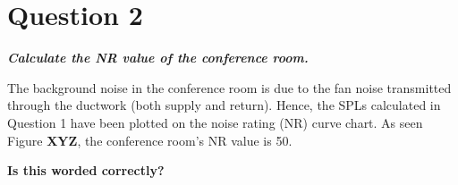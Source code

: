 \section{Question 2}

\textit{\textbf{Calculate the NR value of the conference room.}}

The background noise in the conference room is due to the fan noise transmitted through the ductwork (both supply and return).
Hence, the SPLs calculated in Question 1 have been plotted on the noise rating (NR) curve chart.
As seen Figure \textbf{XYZ}, the conference room's NR value is 50.

\textbf{Is this worded correctly?}
